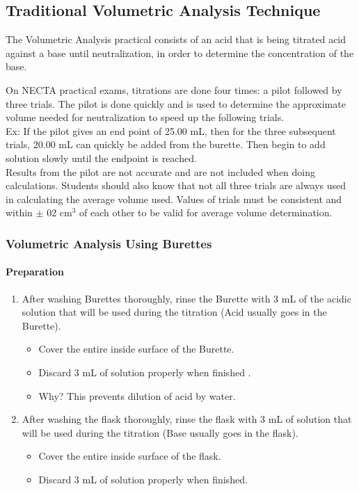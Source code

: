 \subsection{Traditional Volumetric Analysis Technique}
\label{cha:volanatech}

The Volumetric Analysis practical consists of an acid that is being titrated acid against a base until neutralization, in order to determine the concentration of the base.

On NECTA practical exams, titrations are done four times: a pilot followed by three trials. The pilot is done quickly and is used to determine the approximate volume needed for neutralization to speed up the following trials.\\

Ex: If the pilot gives an end point of 25.00 mL, then for the three subsequent trials, 20.00 mL can quickly be added from the burette. Then begin to add solution slowly until the endpoint is reached.\\

Results from the pilot are not accurate and are not included when doing calculations. Students should also know that not all three trials are always used in calculating the average volume used. Values of trials must be consistent and within $\pm$ 02 cm$^3$ of each other to be valid for average volume determination.


\subsubsection{Volumetric Analysis Using Burettes}

\paragraph{Preparation}

\begin{enumerate}
\item After washing Burettes thoroughly, rinse the Burette with 3 mL of the acidic solution that will
be used during the titration (Acid usually goes in the Burette).
	\begin{itemize}
	\item Cover the entire inside surface of the Burette.
	\item Discard 3 mL of solution properly when finished  .
	\item Why? This prevents dilution of acid by water.
	\end{itemize}
\item After washing the flask thoroughly, rinse the flask with 3 mL of solution that will
be used during the titration (Base usually goes in the flask).
	\begin{itemize}
	\item Cover the entire inside surface of the flask.
	\item Discard 3 mL of solution properly when finished.
	\end{itemize}	
\end{enumerate}

